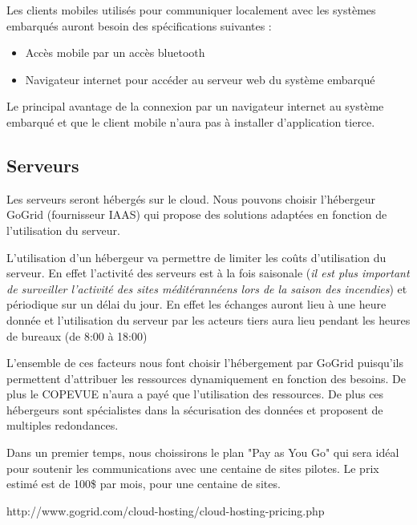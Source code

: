 Les clients mobiles utilisés pour communiquer localement avec les systèmes embarqués auront besoin des spécifications suivantes : 
\begin{itemize}
\item Accès mobile par un accès bluetooth
\item Navigateur internet pour accéder au serveur web du système embarqué
\end{itemize}
Le principal avantage de la connexion par un navigateur internet au système embarqué et que le client mobile n'aura pas à installer d'application tierce.

\subsection{Serveurs}

Les serveurs seront hébergés sur le cloud. Nous pouvons choisir l'hébergeur GoGrid (fournisseur IAAS) 
qui propose des solutions adaptées en fonction de l'utilisation du serveur.

L'utilisation d'un hébergeur va permettre de limiter les coûts d'utilisation du serveur. 
En effet l'activité des serveurs est à la fois saisonale 
(\textit{il est plus important de surveiller l'activité des sites méditérannéens lors de la saison des incendies}) et
périodique sur un délai du jour. En effet les échanges auront lieu à une heure donnée et l'utilisation du serveur par les acteurs tiers aura lieu pendant les heures de bureaux (de 8:00 à 18:00)

L'ensemble de ces facteurs nous font choisir l'hébergement par GoGrid puisqu'ils permettent d'attribuer les ressources dynamiquement en fonction des besoins. De plus le COPEVUE n'aura a payé que l'utilisation des ressources. De plus ces hébergeurs sont spécialistes dans la sécurisation des données et proposent de multiples redondances. 

Dans un premier temps, nous choissirons le plan "Pay as You Go" qui sera idéal pour soutenir les communications avec une centaine de sites pilotes. 
Le prix estimé est de 100\$ par mois, pour une centaine de sites.

http://www.gogrid.com/cloud-hosting/cloud-hosting-pricing.php

